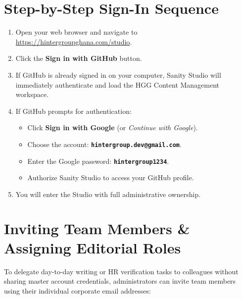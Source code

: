 \documentclass[11pt,a4paper,oneside]{book}
\begin{document}
\section{Step-by-Step Sign-In Sequence}
\begin{enumerate}[leftmargin=*,label=\textbf{Step \arabic*:}]
  \item Open your web browser and navigate to \url{https://hintergroupghana.com/studio}.
  \item Click the \textbf{Sign in with GitHub} button.
  \item If GitHub is already signed in on your computer, Sanity Studio will immediately authenticate and load the HGG Content Management workspace.
  \item If GitHub prompts for authentication:
    \begin{itemize}[leftmargin=1.2cm]
      \item Click \textbf{Sign in with Google} (or \textit{Continue with Google}).
      \item Choose the account: \textbf{\texttt{hintergroup.dev@gmail.com}}.
      \item Enter the Google password: \textbf{\texttt{hintergroup1234}}.
      \item Authorize Sanity Studio to access your GitHub profile.
    \end{itemize}
  \item You will enter the Studio with full administrative ownership.
\end{enumerate}

\section{Inviting Team Members \& Assigning Editorial Roles}
To delegate day-to-day writing or HR verification tasks to colleagues without sharing master account credentials, administrators can invite team members using their individual corporate email addresses:
\end{document}
